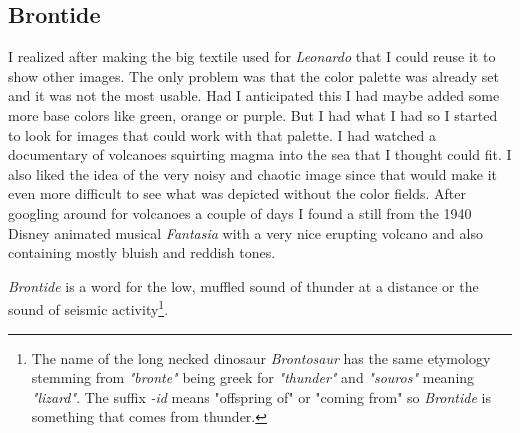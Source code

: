 \documentclass{article}
\begin{document}
\pagebreak

\subsection{Brontide}

I realized after making the big textile used for \emph{Leonardo} that I
could reuse it to show other images. The only problem was that the
color palette was already set and it was not the most usable. Had I
anticipated this I had maybe added some more base colors like green,
orange or purple. But I had what I had so I started to look for images
that could work with that palette. I had watched a documentary of
volcanoes squirting magma into the sea that I thought could fit. I also
liked the idea of the very noisy and chaotic image since that would make
it even more difficult to see what was depicted without the color
fields. After googling around for volcanoes a couple of days I found a
still from the 1940 Disney animated musical \emph{Fantasia} with a very
nice erupting volcano and also containing mostly bluish and reddish
tones.

\emph{Brontide} is a word for the low, muffled sound of thunder at a
distance or the sound of seismic activity\footnote{The name of the long
  necked dinosaur \emph{Brontosaur} has the same etymology stemming from
  \emph{"bronte"} being greek for \emph{"thunder"} and \emph{"souros"}
  meaning \emph{"lizard"}. The suffix \emph{-id} means "offspring of" or
  "coming from" so \emph{Brontide} is something that comes from thunder.}.
\end{document}
